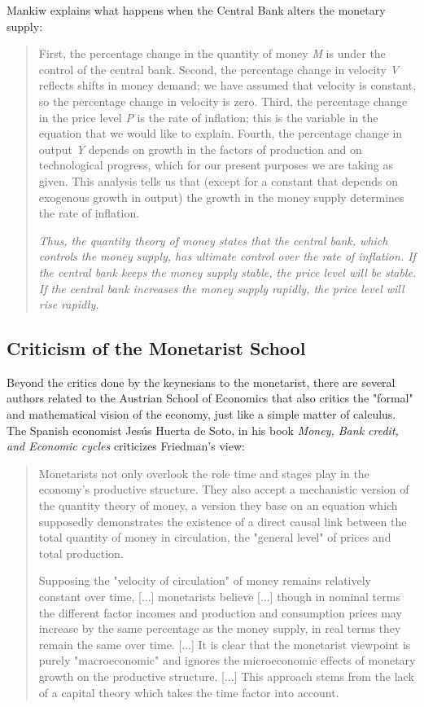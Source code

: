 \documentclass[12pt,a4paper,twoside]{book}
\begin{document}
\begin{itemize}
Mankiw explains what happens when the Central Bank alters the monetary supply:

\begin{quotation}
First, the percentage change in the quantity of money \textit{M} is under the control of the central bank. Second, the percentage change in velocity \textit{V} reflects shifts in money demand; we have assumed that velocity is constant, so the percentage change in velocity is zero. Third, the percentage change in the price level \textit{P} is the rate of inflation; this is the variable in the equation that we would like to explain. Fourth, the percentage change in output \textit{Y} depends on growth in the factors of production and on technological progress, which for our present purposes we are taking as given. This analysis tells us that (except for a constant that depends on exogenous growth in output) the growth in the money supply determines the rate of inflation.

\textit{Thus, the quantity theory of money states that the central bank, which controls the money supply, has ultimate control over the rate of inflation. If the central bank keeps the money supply stable, the price level will be stable. If the central bank increases the money supply rapidly, the price level will rise rapidly.} \cite[p. 90]{mankiw}
\end{quotation}

\subsection{Criticism of the Monetarist School}
Beyond the critics done by the keynesians to the monetarist, there are several authors related to the Austrian School of Economics that also critics the "formal" and mathematical vision of the economy, just like a simple matter of calculus. The Spanish economist Jesús Huerta de Soto, in his book \textit{Money, Bank credit, and Economic cycles} criticizes Friedman's view:

\begin{quotation}
Monetarists not only overlook the role time and stages play in the economy’s productive structure. They also accept a mechanistic version of the quantity theory of money, a version they base on an equation which supposedly demonstrates the existence of a direct causal link between the total quantity of money in circulation, the "general level" of prices and total production.	

Supposing the "velocity of circulation" of money remains relatively constant over time, [...] monetarists believe [...] though in nominal terms the different factor incomes and production and consumption prices may increase by the same percentage as the money supply, in real terms they remain the same over time. [...] It is clear that the monetarist viewpoint is purely "macroeconomic" and ignores the microeconomic effects of monetary growth on the productive structure. [...] This approach stems from the lack of a capital theory which takes the time factor into account. \cite[pp. 522-523]{huertasoto:money}
\end{quotation}


\end{itemize}
\end{document}
